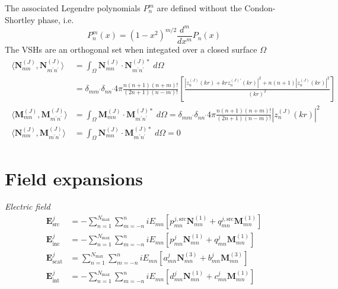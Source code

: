 \documentclass[11pt]{article}
\begin{document}
The associated Legendre polynomials $P_n^m$ are defined without the Condon-Shortley phase, i.e.
\begin{equation}
P_n^m(x) = (1 - x^2)^{m/2} \frac{d^m}{dx^m} P_n(x)
\end{equation}
The VSHs are an orthogonal set when integated over a closed surface $\Omega$
\begin{align}
\begin{split}
    \langle \boldsymbol{N}_{mn}^{(J)}, \boldsymbol{N}_{m^\prime n^\prime}^{(J)} \rangle
    &= \int_\Omega \boldsymbol{N}_{mn}^{(J)} \cdot \boldsymbol{N}_{m^\prime n^\prime}^{(J)*} \;d\Omega \\
    &= \delta_{mm^\prime}\delta_{nn^\prime}4\pi \frac{n(n+1)(n+m)!}{(2n+1)(n-m)!}
      \left[ \frac{\left|z_n^{(J)}(kr) + krz_n^{(J)\prime}(kr)\right|^2 + n(n+1) \left|z_n^{(J)}(kr)\right|^2 }{(kr)^2} \right] \\
    \langle \boldsymbol{M}_{mn}^{(J)}, \boldsymbol{M}_{m^\prime n^\prime}^{(J)} \rangle
    &= \int_\Omega \boldsymbol{M}_{mn}^{(J)} \cdot \boldsymbol{M}_{m^\prime n^\prime}^{(J)*} \;d\Omega
    = \delta_{mm^\prime}\delta_{nn^\prime}4\pi \frac{n(n+1)(n+m)!}{(2n+1)(n-m)!} |z_n^{(J)}(kr)|^2 \\
    \langle \boldsymbol{N}_{mn}^{(J)}, \boldsymbol{M}_{m^\prime n^\prime}^{(J)} \rangle
    &= \int_\Omega \boldsymbol{N}_{mn}^{(J)} \cdot \boldsymbol{M}_{m^\prime n^\prime}^{(J)*} \;d\Omega = 0
\end{split}
\end{align}


\section{Field expansions}
\textit{Electric field}
\begin{align}
    \boldsymbol{E}_\text{src}^j &= - \sum_{n=1}^{N_\text{max}} \sum_{m=-n}^{n}
    iE_{mn} \left[ p_{mn}^{j,\text{src}} \boldsymbol{N}_{mn}^{(1)} + q_{mn}^{j,\text{src}} \boldsymbol{M}_{mn}^{(1)} \right] \\
    \boldsymbol{E}_\text{inc}^j &= - \sum_{n=1}^{N_\text{max}} \sum_{m=-n}^{n}
    iE_{mn} \left[ p_{mn}^j \boldsymbol{N}_{mn}^{(1)} + q_{mn}^j \boldsymbol{M}_{mn}^{(1)} \right] \\
    \boldsymbol{E}_\text{scat}^j &= \sum_{n=1}^{N_\text{max}} \sum_{m=-n}^{n}
    iE_{mn} \left[a_{mn}^j \boldsymbol{N}_{mn}^{(3)} + b_{mn}^j \boldsymbol{M}_{mn}^{(3)} \right] \\
    \boldsymbol{E}_\text{int}^j &= - \sum_{n=1}^{N_\text{max}} \sum_{m=-n}^{n}
    iE_{mn} \left[ d_{mn}^j \boldsymbol{N}_{mn}^{(1)} + c_{mn}^j \boldsymbol{M}_{mn}^{(1)} \right]
\end{align}
\end{document}
